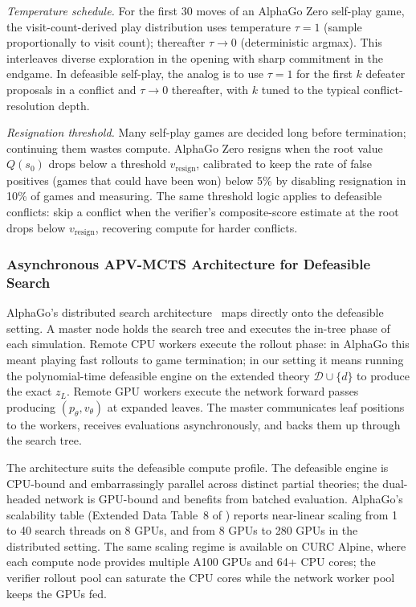 \documentclass{article}
\newcommand{\D}{\mathcal{D}}
\begin{document}
\textit{Temperature schedule.} For the first 30 moves of an AlphaGo Zero self-play game, the visit-count-derived play distribution uses temperature $\tau = 1$ (sample proportionally to visit count); thereafter $\tau \to 0$ (deterministic argmax). This interleaves diverse exploration in the opening with sharp commitment in the endgame. In defeasible self-play, the analog is to use $\tau = 1$ for the first $k$ defeater proposals in a conflict and $\tau \to 0$ thereafter, with $k$ tuned to the typical conflict-resolution depth.

\textit{Resignation threshold.} Many self-play games are decided long before termination; continuing them wastes compute. AlphaGo Zero resigns when the root value $Q(s_0)$ drops below a threshold $v_{\mathrm{resign}}$, calibrated to keep the rate of false positives (games that could have been won) below 5\% by disabling resignation in 10\% of games and measuring. The same threshold logic applies to defeasible conflicts: skip a conflict when the verifier's composite-score estimate at the root drops below $v_{\mathrm{resign}}$, recovering compute for harder conflicts.

\subsubsection{Asynchronous APV-MCTS Architecture for Defeasible Search}

AlphaGo's distributed search architecture~\cite{silver2016alphago} maps directly onto the defeasible setting. A master node holds the search tree and executes the in-tree phase of each simulation. Remote CPU workers execute the rollout phase: in AlphaGo this meant playing fast rollouts to game termination; in our setting it means running the polynomial-time defeasible engine on the extended theory $\D \cup \{d\}$ to produce the exact $z_L$. Remote GPU workers execute the network forward passes producing $(p_\theta, v_\theta)$ at expanded leaves. The master communicates leaf positions to the workers, receives evaluations asynchronously, and backs them up through the search tree.

The architecture suits the defeasible compute profile. The defeasible engine is CPU-bound and embarrassingly parallel across distinct partial theories; the dual-headed network is GPU-bound and benefits from batched evaluation. AlphaGo's scalability table (Extended Data Table~8 of \cite{silver2016alphago}) reports near-linear scaling from 1 to 40 search threads on 8 GPUs, and from 8 GPUs to 280 GPUs in the distributed setting. The same scaling regime is available on CURC Alpine, where each compute node provides multiple A100 GPUs and 64+ CPU cores; the verifier rollout pool can saturate the CPU cores while the network worker pool keeps the GPUs fed.
\end{document}
